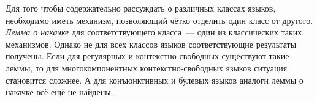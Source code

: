 Для того чтобы содержательно рассуждать о различных классах языков, необходимо иметь механизм, позволяющий чётко отделить один класс от другого.
\emph{Лемма о накачке} для соответствующего класса~--- один из классических таких механизмов.
Однако не для всех классов языков соответствующие результаты получены.
Если для регулярных и контекстно-свободных существуют такие леммы, то для многокомпонентных контекстно-свободных языков ситуация становится сложнее.
А для конъюнктивных и булевых языков аналоги леммы о накачке всё ещё не найдены~.
